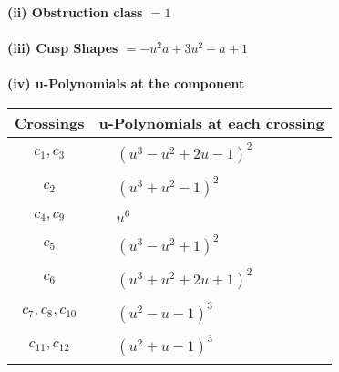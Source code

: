 \documentclass[1p]{elsarticle_modified}
\theoremstyle{definition}
\begin{document}
\flushleft \textbf{(ii) Obstruction class $= 1$}\\~\\
\flushleft \textbf{(iii) Cusp Shapes $= - u^2 a+3 u^2- a+1$}\\~\\
\newpage\renewcommand{\arraystretch}{1}
\flushleft \textbf{(iv) u-Polynomials at the component}\newline \\
\begin{tabular}{m{50pt}|m{274pt}}
Crossings & \hspace{64pt}u-Polynomials at each crossing \\
\hline $$\begin{aligned}c_{1},c_{3}\end{aligned}$$&$\begin{aligned}
&(u^3- u^2+2 u-1)^2
\end{aligned}$\\
\hline $$\begin{aligned}c_{2}\end{aligned}$$&$\begin{aligned}
&(u^3+u^2-1)^2
\end{aligned}$\\
\hline $$\begin{aligned}c_{4},c_{9}\end{aligned}$$&$\begin{aligned}
&u^6
\end{aligned}$\\
\hline $$\begin{aligned}c_{5}\end{aligned}$$&$\begin{aligned}
&(u^3- u^2+1)^2
\end{aligned}$\\
\hline $$\begin{aligned}c_{6}\end{aligned}$$&$\begin{aligned}
&(u^3+u^2+2 u+1)^2
\end{aligned}$\\
\hline $$\begin{aligned}c_{7},c_{8},c_{10}\end{aligned}$$&$\begin{aligned}
&(u^2- u-1)^3
\end{aligned}$\\
\hline $$\begin{aligned}c_{11},c_{12}\end{aligned}$$&$\begin{aligned}
&(u^2+u-1)^3
\end{aligned}$\\
\hline
\end{tabular}\\~\\
\end{document}
